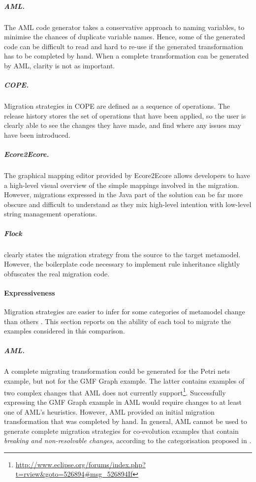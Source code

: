 \subparagraph{AML.} The AML code generator takes a conservative approach to naming variables, to minimise the chances of duplicate variable names. Hence, some of the generated code can be difficult to read and hard to re-use if the generated transformation has to be completed by hand. When a complete transformation can be generated by AML, clarity is not as important.

\subparagraph{COPE.} Migration strategies in COPE are defined as a sequence of operations. The release history stores the set of operations that have been applied, so the user is clearly able to see the changes they have made, and find where any issues may have been introduced.

\subparagraph{Ecore2Ecore.} The graphical mapping editor provided by Ecore2Ecore allows developers to have a high-level visual overview of the simple mappings involved in the migration. However, migrations expressed in the Java part of the solution can be far more obscure and difficult to understand as they mix high-level intention with low-level string management operations.

\subparagraph{Flock} clearly states the migration strategy from the source to the target metamodel.
However, the boilerplate code necessary to implement rule inheritance slightly obfuscates the real migration code.



\paragraph{Expressiveness}
Migration strategies are easier to infer for some categories of metamodel change than others \cite{gruschko07towards}. This section reports on the ability of each tool to migrate the examples considered in this comparison.

\subparagraph{AML.} A complete migrating transformation could be generated for the Petri nets example, but not for the GMF Graph example. The latter contains examples of two complex changes that AML does not currently support\footnote{\url{http://www.eclipse.org/forums/index.php?t=rview&goto=526894#msg_526894If}}. Successfully expressing the GMF Graph example in AML would require changes to at least one of AML's heuristics. However, AML provided an initial migration transformation that was completed by hand.
%
In general, AML cannot be used to generate complete migration strategies for co-evolution examples that contain \emph{breaking and non-resolvable changes}, according to the categorisation proposed in \cite{gruschko07towards}. 

